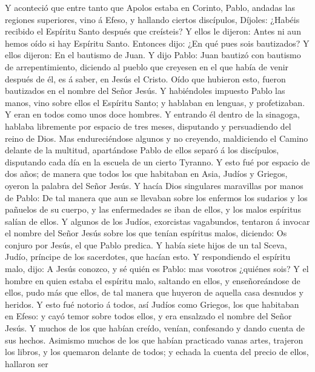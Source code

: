  Y aconteció que entre tanto que Apolos estaba en Corinto,
Pablo, andadas las regiones superiores, vino á Efeso, y hallando ciertos
discípulos,  Díjoles: ¿Habéis recibido el Espíritu Santo
después que creísteis? Y ellos le dijeron: Antes ni aun hemos oído si
hay Espíritu Santo.  Entonces dijo: ¿En qué pues sois
bautizados? Y ellos dijeron: En el bautismo de Juan.  Y dijo
Pablo: Juan bautizó con bautismo de arrepentimiento, diciendo al pueblo
que creyesen en el que había de venir después de él, es á saber, en
Jesús el Cristo.  Oído que hubieron esto, fueron bautizados
en el nombre del Señor Jesús.  Y habiéndoles impuesto Pablo
las manos, vino sobre ellos el Espíritu Santo; y hablaban en lenguas, y
profetizaban.  Y eran en todos como unos doce hombres.
 Y entrando él dentro de la sinagoga, hablaba libremente por
espacio de tres meses, disputando y persuadiendo del reino de Dios.
 Mas endureciéndose algunos y no creyendo, maldiciendo el
Camino delante de la multitud, apartándose Pablo de ellos separó á los
discípulos, disputando cada día en la escuela de un cierto Tyranno.
 Y esto fué por espacio de dos años; de manera que todos
los que habitaban en Asia, Judíos y Griegos, oyeron la palabra del Señor
Jesús.  Y hacía Dios singulares maravillas por manos de
Pablo:  De tal manera que aun se llevaban sobre los
enfermos los sudarios y los pañuelos de su cuerpo, y las enfermedades se
iban de ellos, y los malos espíritus salían de ellos.  Y
algunos de los Judíos, exorcistas vagabundos, tentaron á invocar el
nombre del Señor Jesús sobre los que tenían espíritus malos, diciendo:
Os conjuro por Jesús, el que Pablo predica.  Y había siete
hijos de un tal Sceva, Judío, príncipe de los sacerdotes, que hacían
esto.  Y respondiendo el espíritu malo, dijo: A Jesús
conozco, y sé quién es Pablo: mas vosotros ¿quiénes sois? 
Y el hombre en quien estaba el espíritu malo, saltando en ellos, y
enseñoreándose de ellos, pudo más que ellos, de tal manera que huyeron
de aquella casa desnudos y heridos.  Y esto fué notorio á
todos, así Judíos como Griegos, los que habitaban en Efeso: y cayó temor
sobre todos ellos, y era ensalzado el nombre del Señor Jesús.
 Y muchos de los que habían creído, venían, confesando y
dando cuenta de sus hechos.  Asimismo muchos de los que
habían practicado vanas artes, trajeron los libros, y los quemaron
delante de todos; y echada la cuenta del precio de ellos, hallaron ser
